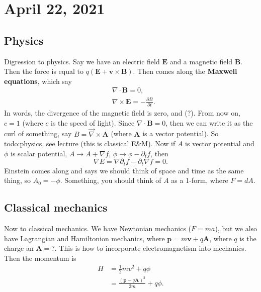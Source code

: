 \section{April 22, 2021} 

\subsection{Physics}
Digression to physics. Say we have an electric field $\mathbf E$ and a magnetic field $\mathbf B$. Then the force is equal to $q(\mathbf E+\mathbf v \times \mathbf B)$. Then comes along the \textbf{Maxwell equations}, which say 
\begin{align*}
    &\nabla\cdot \mathbf B=0,\\
    &\nabla\times \mathbf E= -\frac{\partial B}{\partial t}.
\end{align*}In words, the divergence of the magnetic field is zero, and (?). From now on, $c=1$ (where $c$ is the speed of light). Since $\nabla\cdot \mathbf B=0$, then we can write it as the curl of something, say $B=\vec \nabla\times \mathbf A$ (where $\mathbf A$ is a vector potential). So {\color{red}todo:physics, see lecture}  (this is classical  E\&M). Now if $A$ is vector potential and $\phi$ is scalar potential, $A \to A +\nabla f$, $\phi \to \phi - \partial _t f$, then \[
\nabla E= \nabla \partial _t f - \partial _t \nabla f=0.
\] Einstein comes along and says we should think of space and time as the same thing, so $A_0=-\phi$. Something, you should think of $A$ as a 1-form, where $F=dA$.

\subsection{Classical mechanics}

Now to classical mechanics. We have Newtonian mechanics ($F=ma$), but we also have Lagrangian and Hamiltonion mechanics, where $\mathbf p=m\mathbf v+q \mathbf A$, where $q$ is the charge an $\mathbf A=?$. This is how to incorporate electromagnetism into mechanics. Then the momentum is 
\begin{align*}
    H&=\frac{1}{2}mv ^2 + q \phi\\
     &= \frac{(\mathbf p-q \mathbf A)^2}{2m}+q \phi.
\end{align*}

